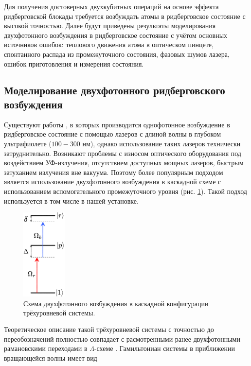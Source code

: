 Для получения достоверных двухкубитных операций на основе эффекта ридберговской блокады требуется возбуждать атомы в ридберговское состояние с высокой точностью. Далее будут приведены результаты моделирования двухфотонного возбуждения в ридберговское состояние с учётом основных источников ошибок: теплового движения атома в оптическом пинцете, спонтанного распада из промежуточного состояния, фазовых шумов лазера, ошибок приготовления и измерения состояния.


\subsection{Моделирование двухфотонного ридберговского возбуждения}

Существуют работы \cite{Srakaew:2023aa}, в которых производится однофотонное возбуждение в ридберговское состояние с помощью лазеров с длиной волны в глубоком ультрафиолете ($100-300$ нм), однако использование таких лазеров технически затруднительно. Возникают проблемы с износом оптического оборудования под воздействием УФ-излучения, отсутствием доступных мощных лазеров, быстрым затуханием излучения вне вакуума. Поэтому более популярным подходом является использование двухфотонного возбуждения в каскадной схеме с использованием вспомогательного промежуточного уровня (рис. \ref{fig:CascadeScheme}). Такой подход используется в том числе в нашей установке. 

\begin{figure}[ht]
	\centering
	\includegraphics[width=0.2\textwidth]{images/CascadeScheme.pdf}
	\caption{Схема двухфотонного возбуждения в каскадной конфигурации трёхуровневой системы.}
	\label{fig:CascadeScheme}
\end{figure}
	
Теоретическое описание такой трёхуровневой системы с точностью до переобозначений полностью совпадает с расмотренными ранее двухфотонными рамановскими переходами в $\Lambda$-схеме \cite{Steck,Lukin}. Гамильтониан системы в приближении вращающейся волны имеет вид 

